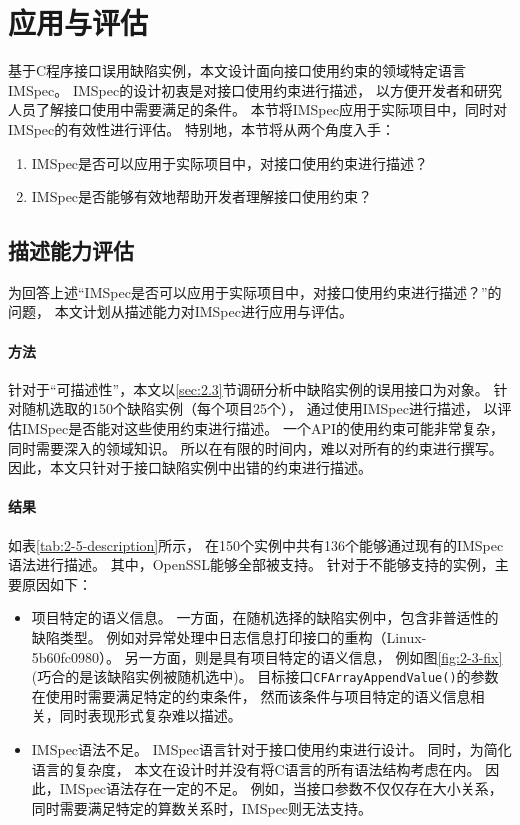 \section{应用与评估}
\label{sec:2.5}
基于C程序接口误用缺陷实例，本文设计面向接口使用约束的领域特定语言IMSpec。
IMSpec的设计初衷是对接口使用约束进行描述，
以方便开发者和研究人员了解接口使用中需要满足的条件。
本节将IMSpec应用于实际项目中，同时对IMSpec的有效性进行评估。
特别地，本节将从两个角度入手：
\begin{enumerate}
	\item IMSpec是否可以应用于实际项目中，对接口使用约束进行描述？
	\item IMSpec是否能够有效地帮助开发者理解接口使用约束？
\end{enumerate}


\subsection{描述能力评估}
为回答上述“IMSpec是否可以应用于实际项目中，对接口使用约束进行描述？”的问题，
本文计划从描述能力对IMSpec进行应用与评估。

\paragraph{方法}
针对于“可描述性”，本文以\ref{sec:2.3}节调研分析中缺陷实例的误用接口为对象。
针对随机选取的150个缺陷实例（每个项目25个），
通过使用IMSpec进行描述，
以评估IMSpec是否能对这些使用约束进行描述。
一个API的使用约束可能非常复杂，同时需要深入的领域知识。
所以在有限的时间内，难以对所有的约束进行撰写。
因此，本文只针对于接口缺陷实例中出错的约束进行描述。

\paragraph{结果}

如表\ref{tab:2-5-description}所示，
在150个实例中共有136个能够通过现有的IMSpec语法进行描述。
其中，OpenSSL能够全部被支持。
针对于不能够支持的实例，主要原因如下：
\begin{itemize}
	\item 项目特定的语义信息。
	一方面，在随机选择的缺陷实例中，包含非普适性的缺陷类型。
	例如对异常处理中日志信息打印接口的重构（Linux-5b60fc0980）。
	另一方面，则是具有项目特定的语义信息，
	例如图\ref{fig:2-3-fix}(巧合的是该缺陷实例被随机选中)。
	目标接口\texttt{CFArrayAppendValue()}的参数在使用时需要满足特定的约束条件，
	然而该条件与项目特定的语义信息相关，同时表现形式复杂难以描述。
	\item IMSpec语法不足。
	IMSpec语言针对于接口使用约束进行设计。
	同时，为简化语言的复杂度，
	本文在设计时并没有将C语言的所有语法结构考虑在内。
	因此，IMSpec语法存在一定的不足。
	例如，当接口参数不仅仅存在大小关系，
	同时需要满足特定的算数关系时，IMSpec则无法支持。
\end{itemize}


